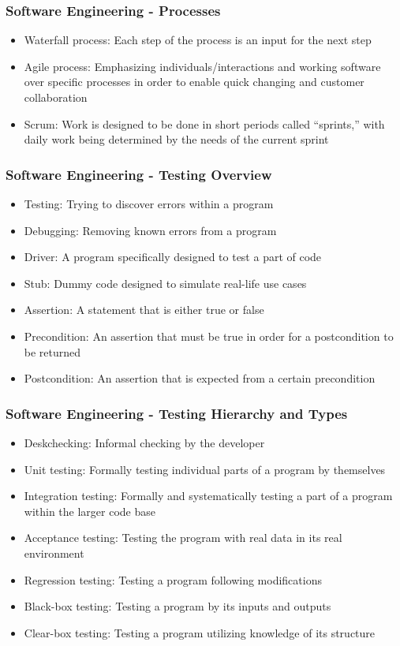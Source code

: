 \begin{frame}\frametitle{Software Engineering - Processes}
\begin{itemize}
\item Waterfall process: Each step of the process is an input for the next step
\item Agile process: Emphasizing individuals/interactions and working software over specific processes in order to enable quick changing and customer collaboration
\item Scrum: Work is designed to be done in short periods called ``sprints,'' with daily work being determined by the needs of the current sprint
\end{itemize}
\end{frame}

\begin{frame}\frametitle{Software Engineering - Testing Overview}
\begin{itemize}
\item Testing: Trying to discover errors within a program
\item Debugging: Removing known errors from a program
\item Driver: A program specifically designed to test a part of code
\item Stub: Dummy code designed to simulate real-life use cases
\item Assertion: A statement that is either true or false
\item Precondition: An assertion that must be true in order for a postcondition to be returned
\item Postcondition: An assertion that is expected from a certain precondition
\end{itemize}
\end{frame}

\begin{frame}\frametitle{Software Engineering - Testing Hierarchy and Types}
\begin{itemize}
\item Deskchecking: Informal checking by the developer
\item Unit testing: Formally testing individual parts of a program by themselves
\item Integration testing: Formally and systematically testing a part of a program within the larger code base
\item Acceptance testing: Testing the program with real data in its real environment
\item Regression testing: Testing a program following modifications
\item Black-box testing: Testing a program by its inputs and outputs
\item Clear-box testing: Testing a program utilizing knowledge of its structure
\end{itemize}
\end{frame}

